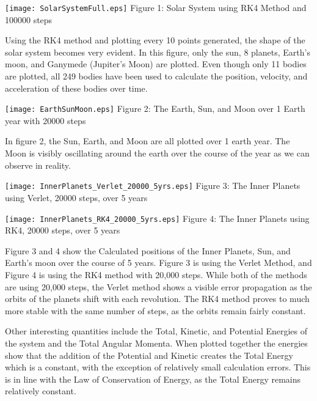 \documentclass{article}
\begin{document}
\begin{multicols}{2}
\begin{center}
\texttt{[image: SolarSystemFull.eps]}
\scriptsize{
Figure 1: Solar System using RK4 Method and 100000 steps
}
\end{center}

Using the RK4 method and plotting every 10 points generated, the shape of the solar system becomes very evident. In this figure, only the sun, 8 planets, Earth's moon, and Ganymede (Jupiter's Moon) are plotted. Even though only 11 bodies are plotted, all 249 bodies have been used to calculate the position, velocity, and acceleration of these bodies over time.

\begin{center}
\texttt{[image: EarthSunMoon.eps]}
\scriptsize{
Figure 2: The Earth, Sun, and Moon over 1 Earth year with 20000 steps
}
\end{center}

In figure 2, the Sun, Earth, and Moon are all plotted over 1 earth year. The Moon is visibly oscillating around the earth over the course of the year as we can observe in reality.

\begin{center}
\texttt{[image: InnerPlanets\_Verlet\_20000\_5yrs.eps]}
\scriptsize{
Figure 3: The Inner Planets using Verlet, 20000 steps, over 5 years
}
\end{center}

\begin{center}
\texttt{[image: InnerPlanets\_RK4\_20000\_5yrs.eps]}
\scriptsize{
Figure 4: The Inner Planets using RK4, 20000 steps, over 5 years
}
\end{center}

Figure 3 and 4 show the Calculated positions of the Inner Planets, Sun, and Earth's moon over the course of 5 years. Figure 3 is using the Verlet Method, and Figure 4 is using the RK4 method with 20,000 steps. While both of the methods are using 20,000 steps, the Verlet method shows a visible error propagation as the orbits of the planets shift with each revolution. The RK4 method proves to much more stable with the same number of steps, as the orbits remain fairly constant.

Other interesting quantities include the Total, Kinetic, and Potential Energies of the system and the Total Angular Momenta. When plotted together the energies show that the addition of the Potential and Kinetic creates the Total Energy which is a constant, with the exception of relatively small calculation errors. This is in line with the Law of Conservation of Energy, as the Total Energy remains relatively constant.


\end{multicols}
\end{document}
